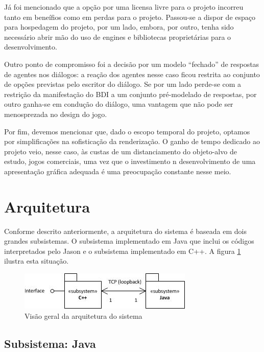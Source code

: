 Já foi mencionado que a opção por uma licensa livre para o projeto incorreu tanto em beneífios como em perdas para o projeto. Passou-se a dispor de espaço para hospedagem do projeto, por um lado, embora, por outro, tenha sido necessário abrir mão do uso de engines e bibliotecas proprietárias para o desenvolvimento.

Outro ponto de compromisso foi a decisão por um modelo ``fechado'' de respostas de agentes nos diálogos: a reação dos agentes nesse caso ficou restrita ao conjunto de opções previstas pelo escritor do diálogo. Se por um lado perde-se com a restrição da manifestação do BDI a um conjunto pré-modelado de respostas, por outro ganha-se em condução do diálogo, uma vantagem que não pode ser menosprezada no design do jogo.

Por fim, devemos mencionar que, dado o escopo temporal do projeto, optamos por simplificações na sofisticação da renderização. O ganho de tempo dedicado ao projeto veio, nesse caso, às custas de um distanciamento do objeto-alvo de estudo, jogos comerciais, uma vez que o investimento n desenvolvimento de uma apresentação gráfica adequada é uma preocupação constante nesse meio.

\section{Arquitetura}

Conforme descrito anteriormente, a arquitetura do sistema é baseada em dois grandes subsistemas. O subsistema implementado em Java que inclui os códigos interpretados pelo Jason e o subsistema implementado em C++. A figura \ref{arquiteturaGeral} ilustra esta situação.

\begin{figure}
\centering
\includegraphics{figuras/arquitetura.jpg}
\caption{Visão geral da arquitetura do sistema}
\label{arquiteturaGeral}
\end{figure}


\subsection{Subsistema: Java}

